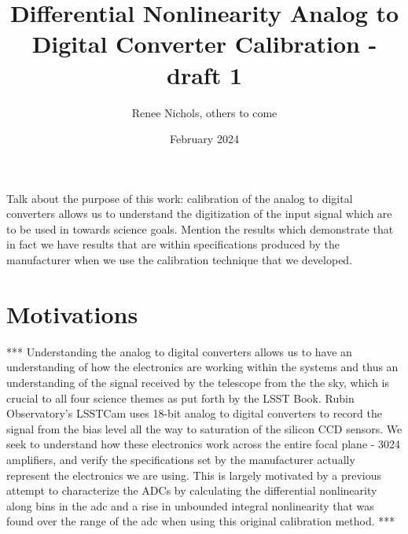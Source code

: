 \documentclass[11pt, letterpaper]{article}
\title{Differential Nonlinearity Analog to Digital Converter Calibration - draft 1}
\author{Renee Nichols, others to come}
\date{February 2024}
\begin{document}
\maketitle 

Talk about the purpose of this work: calibration of the analog to digital converters allows us to understand the digitization of the input signal which are to be used in towards science goals. Mention the results which demonstrate that in fact we have results that are within specifications produced by the manufacturer when we use the calibration technique that we developed. 

\section{Motivations}

*** 
Understanding the analog to digital converters allows us to have an understanding of how the electronics are working within the systems and thus an understanding of the signal received by the telescope from the the sky, which is crucial to all four science themes as put forth by the LSST Book. Rubin Observatory’s LSSTCam uses 18-bit analog to digital converters to record the signal from the bias level all the way to saturation of the silicon CCD sensors. We seek to understand how these electronics work across the entire focal plane - 3024 amplifiers, and verify the specifications set by the manufacturer actually represent the electronics we are using. This is largely motivated by a previous attempt to characterize the ADCs by calculating the differential nonlinearity along bins in the adc and a rise in unbounded integral nonlinearity that was found over the range of the adc when using this original calibration method. 
***
\end{document}
